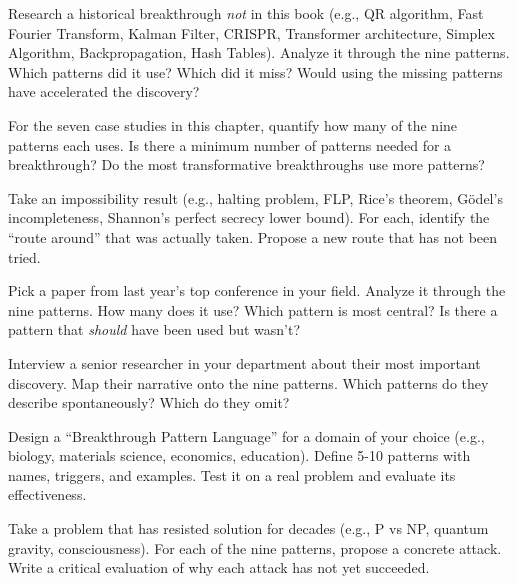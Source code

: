 \begin{exercise}[Intermediate]
Research a historical breakthrough \emph{not} in this book (e.g., QR algorithm, Fast Fourier Transform, Kalman Filter, CRISPR, Transformer architecture, Simplex Algorithm, Backpropagation, Hash Tables). Analyze it through the nine patterns. Which patterns did it use? Which did it miss? Would using the missing patterns have accelerated the discovery?
\end{exercise}

\begin{exercise}[Intermediate]
For the seven case studies in this chapter, quantify how many of the nine patterns each uses. Is there a minimum number of patterns needed for a breakthrough? Do the most transformative breakthroughs use more patterns?
\end{exercise}

\begin{exercise}[Intermediate]
Take an impossibility result (e.g., halting problem, FLP, Rice's theorem, G\"odel's incompleteness, Shannon's perfect secrecy lower bound). For each, identify the ``route around'' that was actually taken. Propose a new route that has not been tried.
\end{exercise}

\begin{exercise}[Intermediate]
Pick a paper from last year's top conference in your field. Analyze it through the nine patterns. How many does it use? Which pattern is most central? Is there a pattern that \emph{should} have been used but wasn't?
\end{exercise}

\begin{exercise}[Intermediate]
Interview a senior researcher in your department about their most important discovery. Map their narrative onto the nine patterns. Which patterns do they describe spontaneously? Which do they omit?
\end{exercise}

\begin{exercise}[Challenge]
Design a ``Breakthrough Pattern Language'' for a domain of your choice (e.g., biology, materials science, economics, education). Define 5-10 patterns with names, triggers, and examples. Test it on a real problem and evaluate its effectiveness.
\end{exercise}

\begin{exercise}[Challenge]
Take a problem that has resisted solution for decades (e.g., P vs NP, quantum gravity, consciousness). For each of the nine patterns, propose a concrete attack. Write a critical evaluation of why each attack has not yet succeeded.
\end{exercise}

